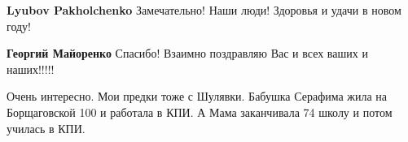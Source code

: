 \begin{itemize}
\begin{itemize} %
\textbf{Lyubov Pakholchenko} Замечательно! Наши люди! Здоровья и удачи в новом году!

\textbf{Георгий Майоренко} Спасибо! Взаимно поздравляю Вас и всех ваших и наших!!!!!
\end{itemize} %

Очень интересно.
Мои предки тоже с Шулявки.
Бабушка Серафима жила на Борщаговской 100 и работала в КПИ.
А Мама заканчивала 74 школу и потом училась в КПИ.


\end{itemize} %
